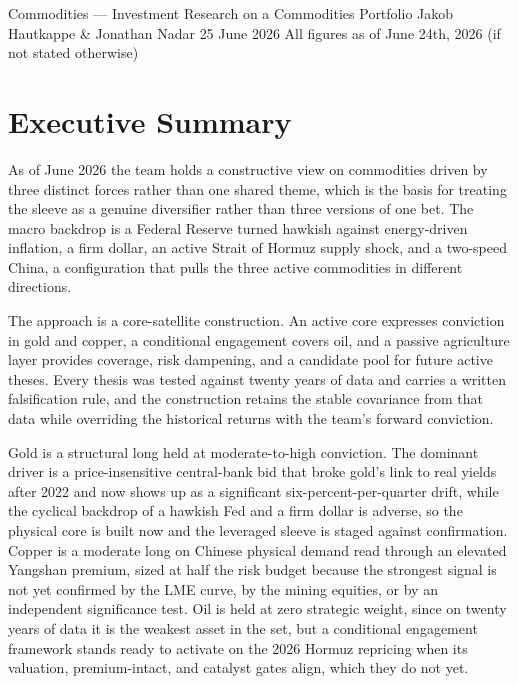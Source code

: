 \documentclass[11pt,a4paper]{article}
\begin{document}
%
{Commodities --- Investment Research on a Commodities Portfolio}%
{Jakob Hautkappe \& Jonathan Nadar}%
{25 June 2026}%
{All figures as of June 24th, 2026 (if not stated otherwise)}

\setcounter{tocdepth}{2}
\tableofcontents
\clearpage

\section{Executive Summary}

As of June 2026 the team holds a constructive view on commodities driven by three distinct forces rather than one shared theme, which is the basis for treating the sleeve as a genuine diversifier rather than three versions of one bet. The macro backdrop is a Federal Reserve turned hawkish against energy-driven inflation, a firm dollar, an active Strait of Hormuz supply shock, and a two-speed China, a configuration that pulls the three active commodities in different directions.

The approach is a core-satellite construction. An active core expresses conviction in gold and copper, a conditional engagement covers oil, and a passive agriculture layer provides coverage, risk dampening, and a candidate pool for future active theses. Every thesis was tested against twenty years of data and carries a written falsification rule, and the construction retains the stable covariance from that data while overriding the historical returns with the team's forward conviction.

Gold is a structural long held at moderate-to-high conviction. The dominant driver is a price-insensitive central-bank bid that broke gold's link to real yields after 2022 and now shows up as a significant six-percent-per-quarter drift, while the cyclical backdrop of a hawkish Fed and a firm dollar is adverse, so the physical core is built now and the leveraged sleeve is staged against confirmation. Copper is a moderate long on Chinese physical demand read through an elevated Yangshan premium, sized at half the risk budget because the strongest signal is not yet confirmed by the LME curve, by the mining equities, or by an independent significance test. Oil is held at zero strategic weight, since on twenty years of data it is the weakest asset in the set, but a conditional engagement framework stands ready to activate on the 2026 Hormuz repricing when its valuation, premium-intact, and catalyst gates align, which they do not yet.
\end{document}
